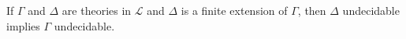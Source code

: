 If $\Gamma$ and $\Delta$ are theories in $\mathcal{L}$ and $\Delta$ is a finite extension of $\Gamma$, then $\Delta$ undecidable implies $\Gamma$ undecidable.

